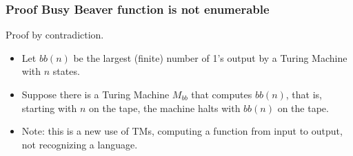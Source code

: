\documentclass{beamer}
\newcommand{\bfr}[1]{\begin{frame}[fragile]\frametitle{{ #1 }}}
\begin{document}
\bfr{Proof Busy Beaver function is not enumerable}

Proof by contradiction.

\begin{itemize}
\item
Let $bb(n)$ be the largest (finite) number of 1's output by a Turing Machine
with $n$ states.
\item
Suppose there is a Turing Machine $M_{bb}$ that computes $bb(n)$, that is,
starting with $n$ on the tape, the machine halts with $bb(n)$ on the tape.


\item Note: this is a new use of TMs, computing a function
  from input to output, not recognizing a language.
\end{itemize}
\end{frame}
\end{document}
